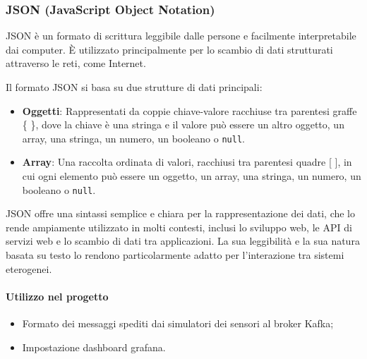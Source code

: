 \subsubsection{JSON (JavaScript Object Notation)}
JSON è un formato di scrittura leggibile dalle persone e facilmente interpretabile dai computer. È utilizzato principalmente per lo scambio di dati strutturati attraverso le reti, come Internet.

Il formato JSON si basa su due strutture di dati principali:

\begin{itemize}
  \item \textbf{Oggetti}: Rappresentati da coppie chiave-valore racchiuse tra parentesi graffe \{ \}, dove la chiave è una stringa e il valore può essere un altro oggetto, un array, una stringa, un numero, un booleano o \texttt{null}.
  \item \textbf{Array}: Una raccolta ordinata di valori, racchiusi tra parentesi quadre [ ], in cui ogni elemento può essere un oggetto, un array, una stringa, un numero, un booleano o \texttt{null}.
\end{itemize}

JSON offre una sintassi semplice e chiara per la rappresentazione dei dati, che lo rende ampiamente utilizzato in molti contesti, inclusi lo sviluppo web, le API di servizi web e lo scambio di dati tra applicazioni. La sua leggibilità e la sua natura basata su testo lo rendono particolarmente adatto per l'interazione tra sistemi eterogenei.
\paragraph{Utilizzo nel progetto}
\begin{itemize}
  \item Formato dei messaggi spediti dai
  simulatori dei sensori
  al broker Kafka;
  \item Impostazione dashboard grafana.
\end{itemize}
